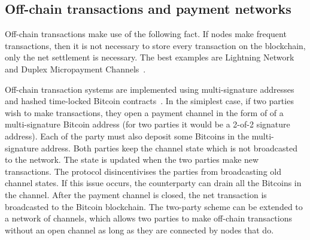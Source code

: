 

\subsection{Off-chain transactions and payment networks}
Off-chain transactions make use of the following fact.
If nodes make frequent transactions,
then it is not necessary to store every transaction on the blockchain,
only the net settlement is necessary.
The best examples are Lightning Network~\cite{lightningnetwork} and Duplex Micropayment Channels~\cite{decker2015fast}.

Off-chain transaction systems are implemented using multi-signature addresses~\cite{bitcoinmultisig} and hashed time-locked Bitcoin contracts~\cite{bitcointimelock}.
In the simiplest case, 
if two parties wish to make transactions,
they open a payment channel in the form of of a multi-signature Bitcoin address (for two parties it would be a 2-of-2 signature address).
Each of the party must also deposit some Bitcoins in the multi-signature address.
Both parties keep the channel state which is not broadcasted to the network.
The state is updated when the two parties make new transactions.
The protocol disincentivises the parties from broadcasting old channel states.
If this issue occurs, the counterparty can drain all the Bitcoins in the channel.
After the payment channel is closed, the net transaction is broadcasted to the Bitcoin blockchain.
The two-party scheme can be extended to a network of channels,
which allows two parties to make off-chain transactions without an open channel as long as they are connected by nodes that do.

